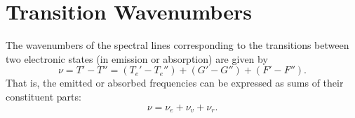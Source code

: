 \section{Transition Wavenumbers}
\label{s:transition_wavenumbers}

The wavenumbers of the spectral lines corresponding to the transitions between two electronic states (in emission or absorption) are given by
\begin{equation}
    \nu = T' - T'' = (T_e' - T_e'') + (G' - G'') + (F' - F'').
\end{equation}
That is, the emitted or absorbed frequencies can be expressed as sums of their constituent parts:
\begin{equation*}
    \nu = \nu_e + \nu_v + \nu_r.
\end{equation*}
